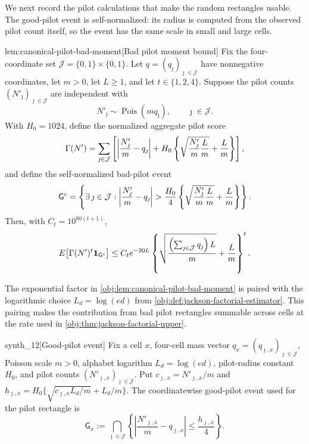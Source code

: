 We next record the pilot calculations that make the random rectangles usable. The good-pilot event is self-normalized: its radius is computed from the observed pilot count itself, so the event has the same scale in small and large cells.

\begin{lemmav}{lem:canonical-pilot-bad-moment}[Bad pilot moment bound]
Fix the four-coordinate set \(\mathcal J=\{0,1\}\times\{0,1\}\). Let \(q=(q_\jmath)_{\jmath\in\mathcal J}\) have nonnegative coordinates, let \(m>0\), let \(L\ge 1\), and let \(t\in\{1,2,4\}\). Suppose the pilot counts \((N'_{\jmath})_{\jmath\in\mathcal J}\) are independent with
\[
N'_{\jmath}\sim \operatorname{Pois}(m q_\jmath),
\qquad \jmath\in\mathcal J .
\]
With \(H_0=1024\), define the normalized aggregate pilot score
\[
\Gamma(N')
=
\sum_{\jmath\in\mathcal J}
\left[
\left|{N'_{\jmath}\over m}-q_\jmath\right|
+
H_0\left\{\sqrt{{N'_{\jmath}\over m}{L\over m}}+{L\over m}\right\}
\right],
\]
and define the self-normalized bad-pilot event
\[
\mathsf G^c
=
\left\{
\exists\,\jmath\in\mathcal J:
\left|{N'_{\jmath}\over m}-q_\jmath\right|
>
{H_0\over 4}
\left\{\sqrt{{N'_{\jmath}\over m}{L\over m}}+{L\over m}\right\}
\right\}.
\]
Then, with \(C_t=10^{80(t+1)}\),
\[
E\!\left[\Gamma(N')^t\mathbf 1_{\mathsf G^c}\right]
\le
C_t e^{-20L}
\left\{
\sqrt{{\left(\sum_{\jmath\in\mathcal J}q_\jmath\right)L\over m}}
+
{L\over m}
\right\}^{t}.
\]
\end{lemmav}

The exponential factor in \cref{obj:lem:canonical-pilot-bad-moment} is paired with the logarithmic choice \(L_d=\log(ed)\) from \cref{obj:def:jackson-factorial-estimator}. This pairing makes the contribution from bad pilot rectangles summable across cells at the rate used in \cref{obj:thm:jackson-factorial-upper}.

\begin{definitionv}{synth_12}[Good-pilot event]
Fix a cell \(x\), four-cell mass vector \(q_x=(q_{\jmath,x})_{\jmath\in\mathcal J}\), Poisson scale \(m>0\), alphabet logarithm \(L_d=\log(ed)\), pilot-radius constant \(H_0\), and pilot counts \((N'_{\jmath,x})_{\jmath\in\mathcal J}\). Put \(c_{\jmath,x}=N'_{\jmath,x}/m\) and \(h_{\jmath,x}=H_0\{\sqrt{c_{\jmath,x}L_d/m}+L_d/m\}\). The coordinatewise good-pilot event used for the pilot rectangle is \[\mathsf G_x:=\bigcap_{\jmath\in\mathcal J}\left\{\left|\frac{N'_{\jmath,x}}{m}-q_{\jmath,x}\right|\le \frac{h_{\jmath,x}}{4}\right\}.\]
\end{definitionv}

